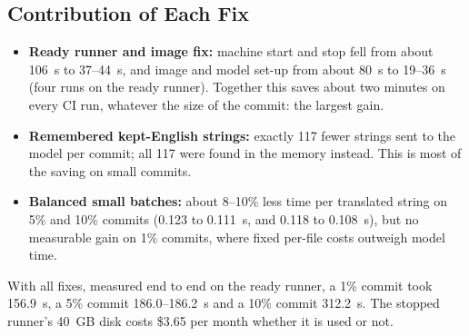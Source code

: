 \subsection{Contribution of Each Fix}
\begin{itemize}
  \item \textbf{Ready runner and image fix:} machine start and stop fell from about 106~s to 37--44~s, and image and model
        set-up from about 80~s to 19--36~s (four runs on the ready runner). Together this saves about two minutes on every
        CI run, whatever the size of the commit: the largest gain.
  \item \textbf{Remembered kept-English strings:} exactly 117 fewer strings sent to the model per commit; all 117 were
        found in the memory instead. This is most of the saving on small commits.
  \item \textbf{Balanced small batches:} about 8--10\% less time per translated string on 5\% and 10\% commits
        (0.123 to 0.111~s, and 0.118 to 0.108~s), but no measurable gain on 1\% commits, where fixed per-file costs
        outweigh model time.
\end{itemize}

With all fixes, measured end to end on the ready runner, a 1\% commit took 156.9~s, a 5\% commit 186.0--186.2~s and a 10\%
commit 312.2~s. The stopped runner's 40~GB disk costs \$3.65 per month whether it is used or not.

